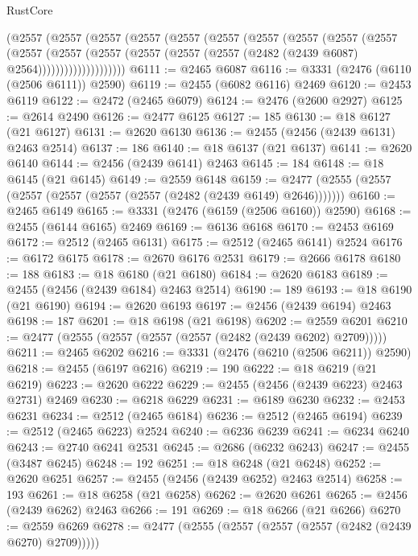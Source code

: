 \begin{lexlean}{RustCore}
\begin{coremodule}
          (@2557
            (@2557
              (@2557
                (@2557
                  (@2557
                    (@2557
                      (@2557
                        (@2557
                          (@2557
                            (@2557
                              (@2557
                                (@2557
                                  (@2557
                                    (@2557
                                      (@2557 (@2557 (@2482 (@2439 @6087) @2564))))))))))))))))))))
@6111 := @2465 @6087
@6116 := @3331 (@2476 (@6110 (@2506 @6111)) @2590)
@6119 := @2455 (@6082 @6116) @2469
@6120 := @2453 @6119
@6122 := @2472 (@2465 @6079)
@6124 := @2476 (@2600 @2927)
@6125 := @2614 @2490
@6126 := @2477 @6125
@6127 := 185
@6130 := @18 @6127 (@21 @6127)
@6131 := @2620 @6130
@6136 := @2455 (@2456 (@2439 @6131) @2463 @2514)
@6137 := 186
@6140 := @18 @6137 (@21 @6137)
@6141 := @2620 @6140
@6144 := @2456 (@2439 @6141) @2463
@6145 := 184
@6148 := @18 @6145 (@21 @6145)
@6149 := @2559 @6148
@6159 := @2477 (@2555 (@2557 (@2557 (@2557 (@2557 (@2557 (@2482 (@2439 @6149) @2646)))))))
@6160 := @2465 @6149
@6165 := @3331 (@2476 (@6159 (@2506 @6160)) @2590)
@6168 := @2455 (@6144 @6165) @2469
@6169 := @6136 @6168
@6170 := @2453 @6169
@6172 := @2512 (@2465 @6131)
@6175 := @2512 (@2465 @6141) @2524
@6176 := @6172 @6175
@6178 := @2670 @6176 @2531
@6179 := @2666 @6178
@6180 := 188
@6183 := @18 @6180 (@21 @6180)
@6184 := @2620 @6183
@6189 := @2455 (@2456 (@2439 @6184) @2463 @2514)
@6190 := 189
@6193 := @18 @6190 (@21 @6190)
@6194 := @2620 @6193
@6197 := @2456 (@2439 @6194) @2463
@6198 := 187
@6201 := @18 @6198 (@21 @6198)
@6202 := @2559 @6201
@6210 := @2477 (@2555 (@2557 (@2557 (@2557 (@2482 (@2439 @6202) @2709)))))
@6211 := @2465 @6202
@6216 := @3331 (@2476 (@6210 (@2506 @6211)) @2590)
@6218 := @2455 (@6197 @6216)
@6219 := 190
@6222 := @18 @6219 (@21 @6219)
@6223 := @2620 @6222
@6229 := @2455 (@2456 (@2439 @6223) @2463 @2731) @2469
@6230 := @6218 @6229
@6231 := @6189 @6230
@6232 := @2453 @6231
@6234 := @2512 (@2465 @6184)
@6236 := @2512 (@2465 @6194)
@6239 := @2512 (@2465 @6223) @2524
@6240 := @6236 @6239
@6241 := @6234 @6240
@6243 := @2740 @6241 @2531
@6245 := @2686 (@6232 @6243)
@6247 := @2455 (@3487 @6245)
@6248 := 192
@6251 := @18 @6248 (@21 @6248)
@6252 := @2620 @6251
@6257 := @2455 (@2456 (@2439 @6252) @2463 @2514)
@6258 := 193
@6261 := @18 @6258 (@21 @6258)
@6262 := @2620 @6261
@6265 := @2456 (@2439 @6262) @2463
@6266 := 191
@6269 := @18 @6266 (@21 @6266)
@6270 := @2559 @6269
@6278 := @2477 (@2555 (@2557 (@2557 (@2557 (@2482 (@2439 @6270) @2709)))))

\end{coremodule}
\end{lexlean}

